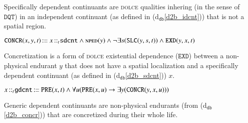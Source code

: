 \documentclass[ao]{iosart2x}
\newcommand{\dolceThrLabel}{\textrm{t$_\texttt{d}$}}
\newcommand{\dbDefLabel}{\textrm{d$_\texttt{db}$}}
\newcounter{cntdbdf}
\newcommand{\dbdf}[1]{\refstepcounter{cntdbdf}\begin{small}{\bf \dbDefLabel\thecntdbdf\label{#1}}\end{small}}
\newcommand{\refdolceth}[1]{({\dolceThrLabel}\ref{#1})}
\newcommand{\refdbdf}[1]{({\dbDefLabel}\ref{#1})}
\newcommand{\pr}[1]{\mathtt{#1}}
\newcommand{\cn}[1]{\mathtt{#1}}
\newcommand\textequal{%
 \rule[.08ex]{5pt}{0.35pt}\llap{\rule[.78ex]{5pt}{0.35pt}}}
\newcommand{\sdef}{{\hspace{1.5pt}:\hspace{-2.5pt}\textequal\hspace{3pt}}}
\newcommand{\dolce}{{\textsc{dolce}}}
\newcommand{\bfo}{{\textsc{bfo}}}
\newcommand {\NPEDdcat} {\textsc{nped}}
\newcommand {\Sdcat} {\textsc{s}}
\newcommand {\PREd} {\ensuremath{\pr{PRE}}}
\newcommand {\DQTd} {\ensuremath{\pr{DQT}}}
\newcommand {\EXDd} {\ensuremath{\pr{EXD}}}
\newcommand {\SLCd} {\ensuremath{\pr{SLC}}}
\newcommand{\idcntbcat}{\cn{idcnt}}
\newcommand{\gdcntbcat}{\cn{gdcnt}}
\newcommand{\sdcntbcat}{\cn{sdcnt}}
\newcommand{\rlzenbcat}{\cn{rlzen}}
\newcommand{\qltbcat}{\cn{qlt}}
\newcommand{\bfoiof}[1]{{\,::_{#1\:\!}}}
\newcommand{\bfoconcr}{\pr{CONCR}}
\begin{document}
\vspace{1pt}
Specifically dependent continuants are {\dolce} qualities inhering (in the sense of $\DQTd$) in an independent continuant (as defined in \refdbdf{d2b_idcnt}) that is not a spatial region.

%
%
%
%

\item[\dbdf{d2b_concr}] $\bfoconcr(x,y,t) \sdef x \bfoiof{t} \sdcntbcat \land \NPEDdcat(y) \land \neg\exists s(\SLCd(y,s,t))  \land \EXDd(y,x,t)$

\vspace{1pt}
Concretization is a form of {\dolce} existential dependence ($\EXDd$) between a non-physical endurant $y$ that does not have a spatial localization and a specifically dependent continuant (as defined in \refdbdf{d2b_sdcnt}) $x$.

%

\item[\dbdf{d2b_gdcnt}] $x \bfoiof{t} \gdcntbcat \sdef \PREd(x,t) \land \forall u(\PREd(x,u) \to \exists y(\bfoconcr(y,x,u)))$

\vspace{1pt}
Generic dependent continuants are non-physical endurants (from \refdbdf{d2b_concr}) that are concretized during their whole life.

%
%
%
%
%
\end{document}
